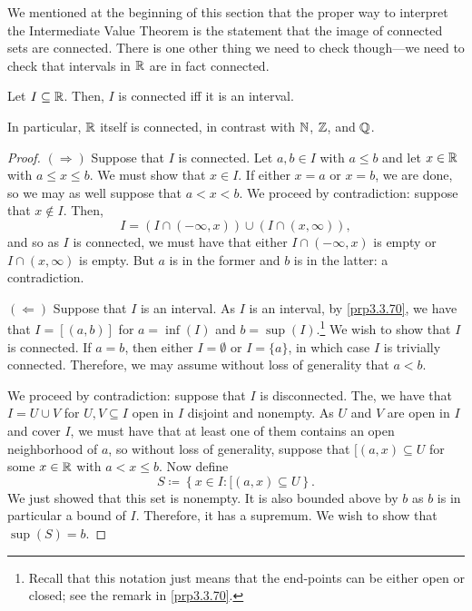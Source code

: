 We mentioned at the beginning of this section that the proper way to interpret the Intermediate Value Theorem is the statement that the image of connected sets are connected.  There is one other thing we need to check though---we need to check that intervals in $\mathbb{R}$ are in fact connected.
\begin{thm}\label{thm4.5.14}
Let $I\subseteq \mathbb{R}$.  Then, $I$ is connected iff it is an interval.
\begin{rmk}
In particular, $\mathbb{R}$ itself is connected, in contrast with $\mathbb{N}$, $\mathbb{Z}$, and $\mathbb{Q}$.
\end{rmk}
\begin{proof}
$(\Rightarrow )$ Suppose that $I$ is connected.  Let $a,b\in I$ with $a\leq b$ and let $x\in \mathbb{R}$ with $a\leq x\leq b$.  We must show that $x\in I$.  If either $x=a$ or $x=b$, we are done, so we may as well suppose that $a<x<b$.  We proceed by contradiction:  suppose that $x\notin I$.  Then,
\begin{equation}
I=(I\cap (-\infty ,x))\cup (I\cap (x,\infty )),
\end{equation}
and so as $I$ is connected, we must have that either $I\cap (-\infty ,x)$ is empty or $I\cap (x,\infty )$ is empty.  But $a$ is in the former and $b$ is in the latter:  a contradiction.

\blankline
\noindent
$(\Leftarrow )$ Suppose that $I$ is an interval.  As $I$ is an interval, by \cref{prp3.3.70}, we have that $I=[(a,b)]$ for $a=\inf (I)$ and $b=\sup (I)$.\footnote{Recall that this notation just means that the end-points can be either open or closed; see the remark in \cref{prp3.3.70}.}  We wish to show that $I$ is connected.  If $a=b$, then either $I=\emptyset$ or $I=\{ a\}$, in which case $I$ is trivially connected.  Therefore, we may assume without loss of generality that $a<b$.

We proceed by contradiction:  suppose that $I$ is disconnected.  The, we have that $I=U\cup V$ for $U,V\subseteq I$ open in $I$ disjoint and nonempty.  As $U$ and $V$ are open in $I$ and cover $I$, we must have that at least one of them contains an open neighborhood of $a$, so without loss of generality, suppose that $[(a,x)\subseteq U$ for some $x\in \mathbb{R}$ with $a<x\leq b$.  Now define
\begin{equation}
S\coloneqq \left\{ x\in I :[(a,x)\subseteq U\right\} .
\end{equation}
We just showed that this set is nonempty.  It is also bounded above by $b$ as $b$ is in particular a bound of $I$.  Therefore, it has a supremum.  We wish to show that $\sup (S)=b$.


\end{proof}
\end{thm}
